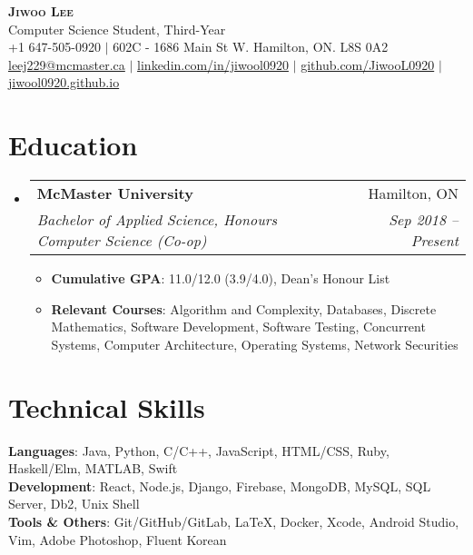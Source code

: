 \documentclass[letterpaper,11pt]{article}
\makeatletter
\newcommand{\resumeItem}[1]{
  \item\small{
    {#1 \vspace{-2pt}}
  }
}
\newcommand{\resumeSubheading}[4]{
  \vspace{-2pt}\item
    \begin{tabular*}{0.97\textwidth}[t]{l@{\extracolsep{\fill}}r}
      \textbf{#1} & #2 \\
      \textit{\small#3} & \textit{\small #4} \\
    \end{tabular*}\vspace{-7pt}
}
\newcommand{\resumeSubHeadingListStart}{\begin{itemize}[leftmargin=0.15in, label={}]}
\newcommand{\resumeSubHeadingListEnd}{\end{itemize}}
\newcommand{\resumeItemListStart}{\begin{itemize}}
\newcommand{\resumeItemListEnd}{\end{itemize}\vspace{-5pt}}
\makeatother
\begin{document}

\begin{center}
    \textbf{\Huge \scshape Jiwoo Lee} \\ \vspace{5pt}
    \large{Computer Science Student, Third-Year} \\ \vspace{10pt}
    \small{+1 647-505-0920} $|$ \small{602C - 1686 Main St W. Hamilton, ON. L8S 0A2} \\
    \href{mailto:leej229@mcmaster.ca}{leej229@mcmaster.ca} $|$ 
    \href{https://linkedin.com/in/jiwool0920}{linkedin.com/in/jiwool0920} $|$
    \href{https://github.com/JiwooL0920}{github.com/JiwooL0920} $|$
    \href{https://jiwool0920.github.io/}{jiwool0920.github.io}
\end{center}

\section{Education}
  \resumeSubHeadingListStart
    \resumeSubheading
      {McMaster University}{Hamilton, ON}
      {Bachelor of Applied Science, Honours Computer Science (Co-op)}{Sep 2018 -- Present}
    \resumeItemListStart
        \resumeItem{\textbf{Cumulative GPA}: 11.0/12.0 (3.9/4.0), Dean's Honour List}
        \resumeItem{\textbf{Relevant Courses}: Algorithm and Complexity, Databases, Discrete Mathematics, Software Development, Software Testing, Concurrent Systems, Computer Architecture, Operating Systems, Network Securities }
    \resumeItemListEnd
  \resumeSubHeadingListEnd


\section{Technical Skills}
 \begin{itemize}[leftmargin=0.15in, label={}]
    \small{\item{
     \textbf{Languages}{: Java, Python, C/C++, JavaScript, HTML/CSS, Ruby, Haskell/Elm, MATLAB, Swift} \\
     \textbf{Development}{: React, Node.js, Django, Firebase, MongoDB, MySQL, SQL Server, Db2, Unix Shell} \\
      \textbf{Tools \& Others}{: Git/GitHub/GitLab, LaTeX, Docker, Xcode, Android Studio, Vim, Adobe Photoshop, Fluent Korean} \\

    }}
 \end{itemize}
\end{document}
